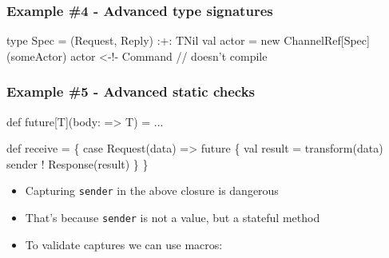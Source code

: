 \documentclass[svgnames,hyperref={bookmarks=false}]{beamer}
\begin{document}
\begin{frame}[fragile]
\frametitle{Example \#4 - Advanced type signatures}

\begin{semiverbatim}
type Spec = (Request, Reply) :+: TNil
val actor = new ChannelRef[Spec](someActor)
\alert{actor <-!- Command // doesn't compile}

\end{semiverbatim}

\begin{itemize}
\end{itemize}
\end{frame}

\begin{frame}[fragile, t]
\frametitle{Example \#5 - Advanced static checks}

\begin{semiverbatim}
def future[T](body: => T) = ...

def receive = \{
  case Request(data) =>
    future \{
      val result = transform(data)
      sender ! Response(result)
    \}
\}

\end{semiverbatim}

\begin{itemize}
\item Capturing \texttt{sender} in the above closure is dangerous
\item That's because \texttt{sender} is not a value, but a stateful method
\item To validate captures we can use macros: 
\end{itemize}
\end{frame}
\end{document}

